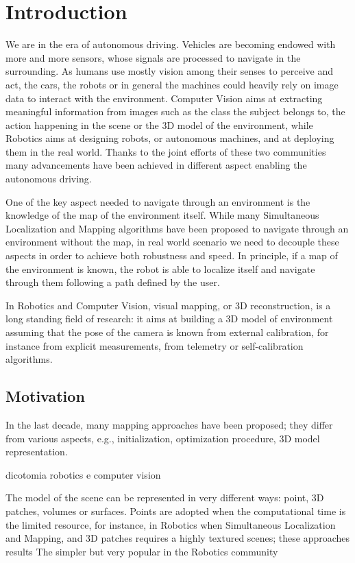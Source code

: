 
\chapter*{Introduction}
\label{sec:intro}
We are in the era of autonomous driving. Vehicles are becoming endowed with more and more sensors, whose signals are processed to navigate in the surrounding.
As humans use mostly vision among their senses to perceive and act, the cars, the robots or in general the machines could heavily rely on image data to interact with the environment.
Computer Vision aims at extracting meaningful information from images such as the class the subject belongs to, the action happening in the scene or the 3D model of the environment, while Robotics aims at designing robots, or autonomous machines, and at deploying them in the real world.
Thanks to the joint efforts of these two communities many advancements have been achieved in different aspect enabling the autonomous driving.

One of the key aspect needed to navigate through an environment is the knowledge of the map of the environment itself. 
While many Simultaneous Localization and Mapping algorithms have been proposed to navigate through an environment without the map, in real world scenario we need to decouple these aspects in order to achieve both robustness and speed.
In principle, if a map of the environment is known, the robot is able to localize itself and navigate through them following a path defined by the user.

In Robotics and Computer Vision, visual mapping, or 3D reconstruction, is a long standing field of research: it aims at building a 3D model of environment assuming that the pose of the camera is known from external calibration, for instance from explicit measurements, from telemetry or self-calibration algorithms.

\section{Motivation}
In the last decade, many mapping approaches have been proposed; they differ from various aspects, e.g., initialization, optimization procedure, 3D model representation.

dicotomia robotics e computer vision

The model of the scene can be represented in very different ways: point, 3D patches, volumes or surfaces.
Points are adopted when the computational time is the limited resource, for instance, in Robotics when Simultaneous Localization and Mapping, and 3D patches requires a highly textured scenes; these  approaches results
The simpler but very popular in the Robotics community 

